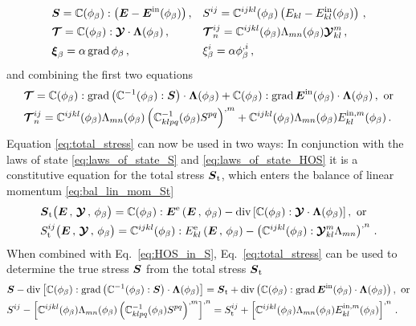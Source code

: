 \documentclass[preprint,review,3p,times,authoryear]{elsarticle}
\begin{document}
\begin{subequations}
\begin{align}
  \label{eq:laws_of_state_S}
  & \boldsymbol{S}   = \mathbb{C}(\phi_{\beta}) : \bigl( \boldsymbol{E} - \boldsymbol{E}^{\text{in}}(\phi_{\beta}) \bigr) \,,
  && S^{ij} =  \mathbb{C}^{ijkl}(\phi_{\beta})\left(E_{kl} - E_{kl}^{\text{in}}(\phi_{\beta})\right)\,,\\
    \label{eq:laws_of_state_HOS}
  & \boldsymbol{\mathcal{T}} = \mathbb{C}(\phi_{\beta}):\boldsymbol{\mathcal{Y}}\cdot\boldsymbol{\Lambda{}}(\phi_{\beta})\,,
  && \boldsymbol{\mathcal{T}}^{ij}_{n} = \mathbb{C}^{ijkl}(\phi_{\beta})\Lambda_{mn}(\phi_{\beta}) \boldsymbol{\mathcal{Y}}_{kl}^{m}\,,\\
     \label{eq:laws_of_state_OP}
  & \boldsymbol{\xi}_{\beta} = \alpha\operatorname*{grad}\phi_{\beta}\,,
  && \xi_{\beta}^{i} = \alpha\phi_{\beta}^{,i}\,,
\end{align}
\end{subequations}
and combining the first two equations
\begin{align}
  \label{eq:HOS_in_S}
  &\boldsymbol{\mathcal{T}}  = \mathbb{C}(\phi_{\beta}):\operatorname*{grad}{\left(\mathbb{C}^{-1}(\phi_{\beta}):\boldsymbol{S}\right)}\cdot\boldsymbol{\Lambda{}}(\phi_{\beta}) + \mathbb{C}(\phi_{\beta}):\operatorname*{grad}{\boldsymbol{E}^{\text{in}}(\phi_{\beta})}\cdot\boldsymbol{\Lambda{}}(\phi_{\beta})\,, \text{ or}\\
  &\boldsymbol{\mathcal{T}}^{ij}_{n} = \mathbb{C}^{ijkl}(\phi_{\beta})\Lambda_{mn}(\phi_{\beta})\left(\mathbb{C}^{-1}_{klpq}(\phi_{\beta}) S^{pq}\right)^{,m} + \mathbb{C}^{ijkl}(\phi_{\beta})\Lambda_{mn}(\phi_{\beta})E_{kl}^{\text{in},m}(\phi_{\beta}) \,.
\end{align}
Equation \eqref{eq:total_stress} can now be used in two ways: In conjunction with the laws of state \eqref{eq:laws_of_state_S} and \eqref{eq:laws_of_state_HOS} it is a constitutive equation for the total stress $\boldsymbol{S}_{\text{t}}$, which enters the balance of linear momentum \eqref{eq:bal_lin_mom_St}
\begin{align}
  \label{eq:const_St}
  &\boldsymbol{S}_{\text{t}}\bigl( \boldsymbol{E}\,,\, \boldsymbol{\mathcal{Y}}\,,\, \phi_{\beta} \bigr) = \mathbb{C}(\phi_{\beta}):\boldsymbol{E}^{\text{e}}\left(\boldsymbol{E}\,,\,\phi_{\beta}\right) - \operatorname*{div}{\left[ \mathbb{C}(\phi_{\beta}):\boldsymbol{\mathcal{Y}}\cdot\boldsymbol{\Lambda{}}(\phi_{\beta})\right]}\,, \text{ or}\\
  &S_{\text{t}}^{ij}\bigl( \boldsymbol{E}\,,\, \boldsymbol{\mathcal{Y}}\,,\, \phi_{\beta} \bigr) = \mathbb{C}^{ijkl}(\phi_{\beta}):E^{\text{e}}_{kl}\left( \boldsymbol{E}\,,\,\phi_{\beta} \right) - \left( \mathbb{C}^{ijkl}(\phi_{\beta}):\boldsymbol{\mathcal{Y}}_{kl}^{m}\Lambda_{mn} \right)^{,n}\,.
\end{align}
When combined with Eq.~\eqref{eq:HOS_in_S}, Eq.~\eqref{eq:total_stress} can  be used  to determine the true stress $\boldsymbol{S}$ from the total stress $\boldsymbol{S}_{\text{t}}$
\begin{align}
  \label{eq:total_stress_S}
  &\boldsymbol{S} -\operatorname*{div}{\left[  \mathbb{C}(\phi_{\beta}):\operatorname*{grad}{\left(\mathbb{C}^{-1}(\phi_{\beta}):\boldsymbol{S}\right)}\cdot\boldsymbol{\Lambda{}}(\phi_{\beta}) \right]} = \boldsymbol{S}_{\text{t}} + \operatorname*{div}{\bigl(\mathbb{C}(\phi_{\beta}):\operatorname*{grad}{\boldsymbol{E}^{\text{in}}(\phi_{\beta})}\cdot\boldsymbol{\Lambda{}}(\phi_{\beta})\bigr)}\,, \text{ or}\\
  &S^{ij} - \left[ \mathbb{C}^{ijkl}(\phi_{\beta})\Lambda_{mn}(\phi_{\beta})\left(\mathbb{C}^{-1}_{klpq}(\phi_{\beta}) S^{pq}\right)^{,m} \right]^{,n} = S_{\text{t}}^{ij} + \left[ \mathbb{C}^{ijkl}(\phi_{\beta})\Lambda_{mn}(\phi_{\beta})E_{kl}^{\text{in},m}(\phi_{\beta}) \right]^{,n}\,.
\end{align}
\end{document}
